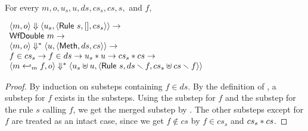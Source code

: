 \begin{lemma}
  \label{lem-inlinedmm-rule}
  \mbox{}\\
  For every $m, o, u_s, u, ds, cs_s, cs, s,$ and $f,$
  \begin{center}
    \begin{math}
      \begin{array}{l}
        \langle m, o \rangle \Downarrow \langle u_s, \langle \textsf{Rule}\ s, [], cs_s \rangle \rangle \to \\
        \textsf{WfDouble}\ m \to \\
        \langle m, o \rangle \Downarrow^{\ast} \langle u, \langle \textsf{Meth}, ds, cs \rangle \rangle \to \\
        f \in cs_s \to f \in ds \to u_s \ast u \to cs_s \ast cs \to \\
        \langle m \hookleftarrow_{m}{} f, o \rangle \Downarrow^{\ast} \langle u_s \uplus u, \langle \textsf{Rule}\ s, ds \smallsetminus{} f, cs_s \uplus cs \smallsetminus{} f \rangle \rangle
      \end{array}
    \end{math}
  \end{center}
\end{lemma}
\begin{proof}
  By induction on substeps containing $f \in ds$. By the definition of
  \Substeps{}, a substep for $f$ exists in the substeps. Using the
  substep for $f$ and the substep for the rule $s$ calling $f$, we get
  the merged substep by . The other
  substeps except for $f$ are treated as an intact case, since we get
  $f \notin cs$ by $f \in cs_s$ and $cs_s \ast cs$.
\end{proof}

